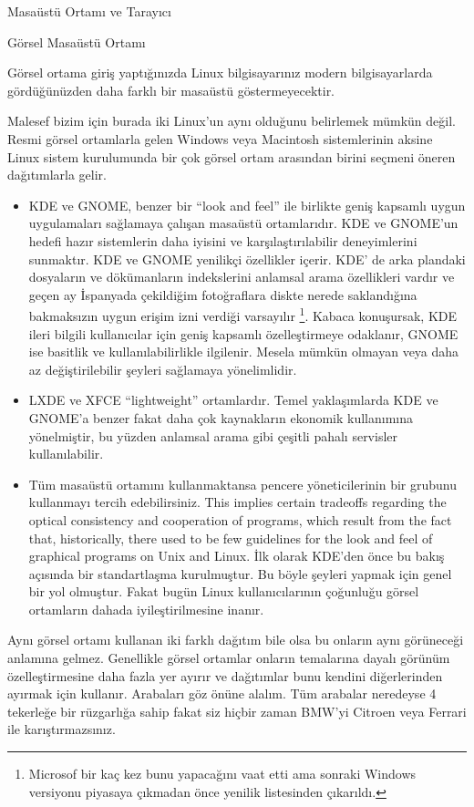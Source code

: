 \begin{section}{Masaüstü Ortamı ve Tarayıcı}
\begin{subsection}{Görsel Masaüstü Ortamı}

Görsel ortama giriş yaptığınızda Linux bilgisayarınız modern bilgisayarlarda gördüğünüzden daha farklı bir masaüstü göstermeyecektir. 

Malesef bizim için burada iki Linux’un aynı olduğunu belirlemek mümkün değil. Resmi görsel ortamlarla gelen Windows veya Macintosh sistemlerinin aksine Linux sistem kurulumunda bir çok görsel ortam arasından birini seçmeni öneren dağıtımlarla gelir. 
\begin{itemize}
\item KDE ve GNOME, benzer bir “look and feel” ile birlikte geniş kapsamlı uygun uygulamaları sağlamaya çalışan masaüstü ortamlarıdır. KDE ve GNOME’un hedefi hazır sistemlerin daha iyisini ve karşılaştırılabilir deneyimlerini sunmaktır. KDE ve GNOME yenilikçi özellikler içerir. KDE’ de arka plandaki dosyaların ve dökümanların indekslerini anlamsal arama özellikleri vardır ve geçen ay İspanyada çekildiğim fotoğraflara diskte nerede saklandığına bakmaksızın uygun erişim izni verdiği varsayılır
\footnote{Microsof bir kaç kez bunu yapacağını vaat etti ama sonraki Windows versiyonu piyasaya çıkmadan önce yenilik listesinden çıkarıldı.}. Kabaca konuşursak, KDE ileri bilgili kullanıcılar için geniş kapsamlı özelleştirmeye odaklanır, GNOME ise basitlik ve kullanılabilirlikle ilgilenir. Mesela mümkün olmayan veya daha az değiştirilebilir şeyleri sağlamaya yönelimlidir. 
\item LXDE ve XFCE “lightweight” ortamlardır. Temel yaklaşımlarda KDE ve GNOME’a benzer fakat daha çok kaynakların ekonomik kullanımına yönelmiştir, bu yüzden anlamsal arama gibi çeşitli pahalı servisler kullanılabilir. 
\item Tüm masaüstü ortamını kullanmaktansa pencere yöneticilerinin bir grubunu kullanmayı tercih edebilirsiniz. This implies certain tradeoffs regarding the optical consistency and cooperation of programs, which result from the fact that, historically, there used to be few guidelines for the look and feel of graphical programs on Unix and Linux. İlk olarak KDE’den önce bu bakış açısında bir standartlaşma kurulmuştur. Bu böyle şeyleri yapmak için genel bir yol olmuştur. Fakat bugün Linux kullanıcılarının çoğunluğu görsel ortamların  dahada iyileştirilmesine inanır. 
\end{itemize}

Aynı görsel ortamı kullanan iki farklı dağıtım bile olsa bu onların aynı görüneceği anlamına gelmez. Genellikle görsel ortamlar onların temalarına dayalı görünüm özelleştirmesine daha fazla yer ayırır ve dağıtımlar bunu kendini diğerlerinden ayırmak için kullanır. Arabaları göz önüne alalım. Tüm arabalar neredeyse 4 tekerleğe bir rüzgarlığa sahip fakat siz hiçbir zaman BMW’yi Citroen veya Ferrari ile karıştırmazsınız. 


\end{subsection}
\end{section}
